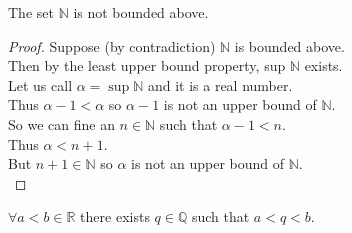 \documentclass[answers,12pt,addpoints]{exam}
\begin{document}
\begin{theorem}
    The set $\mathbb{N}$ is not bounded above.\\
    \begin{proof}
        Suppose (by contradiction) $\mathbb{N}$ is bounded above. \\
        Then by the least upper bound property, sup $\mathbb{N}$ exists. \\
        Let us call $\alpha = \sup\mathbb{N}$ and it is a real number. \\
        Thus $\alpha - 1 < \alpha$ so $\alpha - 1$ is not an upper bound of $\mathbb{N}$. \\
        So we can fine an $n \in \mathbb{N}$ such that $ \alpha - 1 < n$. \\
        Thus $\alpha < n + 1$. \\
        But $n + 1 \in \mathbb{N}$ so $\alpha$ is not an upper bound of $\mathbb{N}$. \\
    \end{proof}
\end{theorem}
\begin{theorem}
    $\forall a < b \in \mathbb{R}$ there exists $q \in \mathbb{Q}$ such that $a < q < b$.
\end{theorem}
\newpage
\end{document}

